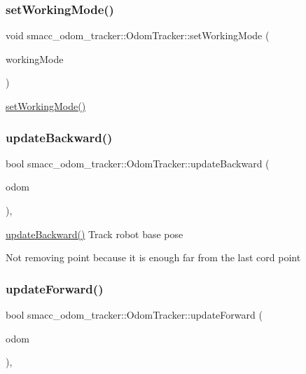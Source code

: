 \subsubsection{\texorpdfstring{set\+Working\+Mode()}{setWorkingMode()}}
{\footnotesize\ttfamily void smacc\+\_\+odom\+\_\+tracker\+::\+Odom\+Tracker\+::set\+Working\+Mode (\begin{DoxyParamCaption}\item[{Working\+Mode}]{working\+Mode }\end{DoxyParamCaption})}

\hyperlink{classsmacc__odom__tracker_1_1OdomTracker_a38fbca999297c46dc95628cc60851a45}{set\+Working\+Mode()} \mbox{\label{classsmacc__odom__tracker_1_1OdomTracker_a3a47119be9af27de9115b043d1f76fe7}} 
\subsubsection{\texorpdfstring{update\+Backward()}{updateBackward()}}
{\footnotesize\ttfamily bool smacc\+\_\+odom\+\_\+tracker\+::\+Odom\+Tracker\+::update\+Backward (\begin{DoxyParamCaption}\item[{const nav\+\_\+msgs\+::\+Odometry \&}]{odom }\end{DoxyParamCaption})\hspace{0.3cm}{\ttfamily [protected]}, {\ttfamily [virtual]}}

\hyperlink{classsmacc__odom__tracker_1_1OdomTracker_a3a47119be9af27de9115b043d1f76fe7}{update\+Backward()} Track robot base pose

Not removing point because it is enough far from the last cord point \mbox{\label{classsmacc__odom__tracker_1_1OdomTracker_a7ef4ecc171a6fd37b2ed3c96a58e0659}} 
\subsubsection{\texorpdfstring{update\+Forward()}{updateForward()}}
{\footnotesize\ttfamily bool smacc\+\_\+odom\+\_\+tracker\+::\+Odom\+Tracker\+::update\+Forward (\begin{DoxyParamCaption}\item[{const nav\+\_\+msgs\+::\+Odometry \&}]{odom }\end{DoxyParamCaption})\hspace{0.3cm}{\ttfamily [protected]}, {\ttfamily [virtual]}}


